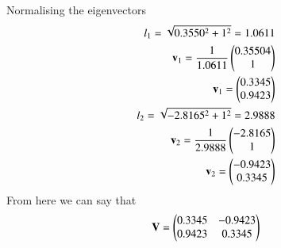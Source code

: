 \documentclass[journal,12pt,twocolumn]{IEEEtran}
\begin{document}
Normalising the eigenvectors
\begin{align}
l_1=\sqrt{0.3550^2+1^2}=1.0611\\
\mathbf{v}_1=\frac{1}{1.0611}\begin{pmatrix}0.35504\\1\end{pmatrix}\\
\mathbf{v}_1=\begin{pmatrix}0.3345\\0.9423\end{pmatrix}\\
l_2=\sqrt{-2.8165^2+1^2}=2.9888\\
\mathbf{v}_2=\frac{1}{2.9888}\begin{pmatrix}-2.8165\\1\end{pmatrix}\\
\mathbf{v}_2=\begin{pmatrix}-0.9423\\0.3345\end{pmatrix}
\end{align}
From here we can say that
\begin{align}
\mathbf{V}=\begin{pmatrix}0.3345&-0.9423\\0.9423&0.3345\end{pmatrix}
\end{align}
\end{document}
